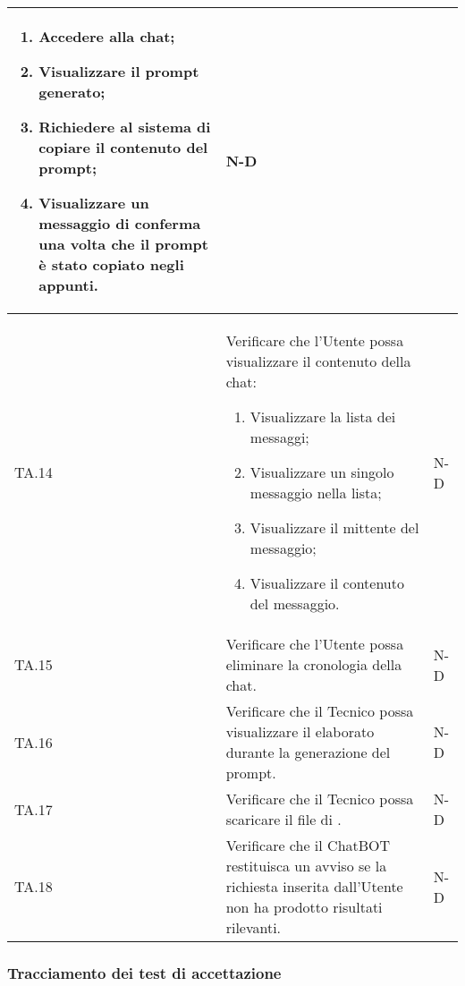 \begin{adjustwidth}{-0.5cm}{-0.5cm}
\begin{longtable}{|P{1.5cm}|>{\raggedright}P{9.5cm}|>{\arraybackslash}P{1.5cm}|}
\begin{enumerate}
			\item Accedere alla chat;
			\item Visualizzare il prompt generato;
			\item Richiedere al sistema di copiare il contenuto del prompt;
			\item Visualizzare un messaggio di conferma una volta che il prompt è stato copiato negli appunti.				
		\end{enumerate}
		& N-D \\
		\hline TA.14 & Verificare che l'Utente possa visualizzare il contenuto della chat: 
		\begin{enumerate}
			\item Visualizzare la lista dei messaggi;
			\item Visualizzare un singolo messaggio nella lista;
			\item Visualizzare il mittente del messaggio;
			\item Visualizzare il contenuto del messaggio.						
		\end{enumerate}
		& N-D \\
		\hline TA.15 & Verificare che l'Utente possa eliminare la cronologia della chat. & N-D \\
		\hline TA.16 & Verificare che il Tecnico possa visualizzare il  elaborato durante la generazione del prompt. & N-D \\
		\hline TA.17 & Verificare che il Tecnico possa scaricare il file di . & N-D \\
		\hline TA.18 & Verificare che il ChatBOT restituisca un avviso se la richiesta inserita dall'Utente non ha prodotto risultati rilevanti. & N-D \\
	\end{longtable}
\end{adjustwidth}
\egroup

\subsubsection{Tracciamento dei test di accettazione}

